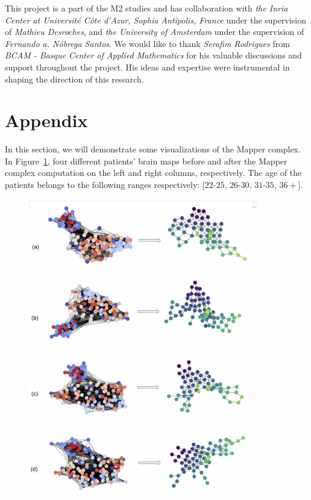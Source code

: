 \documentclass[runningheads]{llncs}
\begin{document}
This project is a part of the M2 studies and has collaboration with \textit{the Inria Center at Universit{\'e} C{\^o}te d'Azur, Sophia Antipolis, France} under the supervision of \textit{Mathieu Desroches}, and \textit{the University of Amsterdam} under the supervision of \textit{Fernando a. Nóbrega Santos}. We would like to thank \textit{Serafim Rodrigues} from \textit{BCAM - Basque Center of Applied Mathematics} for his valuable discussions and support throughout the project. His ideas and expertise were instrumental in shaping the direction of this research.


%

%
%
%
% 
% 
%



\small


\newpage

\section*{Appendix}
In this section, we will demonstrate some visualizations of the Mapper complex. In Figure~\ref{appendix}, four different patients' brain maps before and after the Mapper complex computation on the left and right columns, respectively. The age of the patients belongs to the following ranges respectively: [$22$-$25$, $26$-$30$, $31$-$35$, $36+$].
%
\begin{figure}[!ht]
  \centering
  \includegraphics[width=10cm]{images/Appendix.png}
  \caption{\textit{ }}
  \label{appendix}
\end{figure}
%
\end{document}
